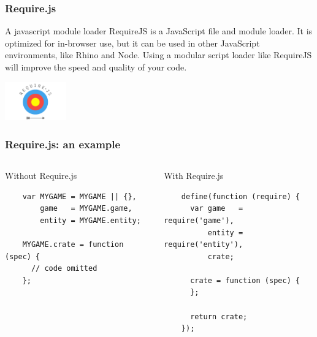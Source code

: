 \begin{frame}[fragile]
  \frametitle{Require.js}

  \begin{block}{A javascript module loader}
    RequireJS is a JavaScript file and module loader. It is optimized for in-browser use, but it can be used in other JavaScript environments, like Rhino and Node. Using a modular script loader like RequireJS will improve the speed and quality of your code.
  \end{block}

  \begin{center}
    \includegraphics[width=100px]{images/requirejs-logo.png}
  \end{center}
\end{frame}

\begin{frame}[fragile]
  \frametitle{Require.js: an example}

  \begin{columns}[c]

  \column{2.25in}
  \begin{block}{Without Require.js}
    {\scriptsize
    \begin{verbatim}
    var MYGAME = MYGAME || {},
        game   = MYGAME.game,
        entity = MYGAME.entity;

    MYGAME.crate = function (spec) {
      // code omitted
    };
    \end{verbatim}
    }
  \end{block}

  \column{2.25in}

  \begin{block}{With Require.js}
    {\scriptsize
    \begin{verbatim}
    define(function (require) {
      var game   = require('game'),
          entity = require('entity'),
          crate;

      crate = function (spec) {
      };

      return crate;
    });
    \end{verbatim}
    }
  \end{block}

  \end{columns}
\end{frame}

